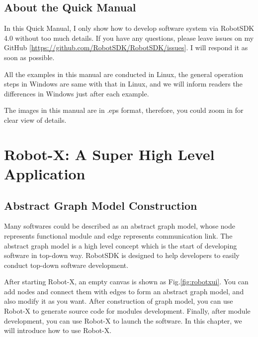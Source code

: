 \documentclass[a4paper,10pt]{book}
\begin{document}
\section{About the Quick Manual}

In this Quick Manual, I only show how to develop software system via RobotSDK 4.0 without too much details. If you have any questions, please leave issues on my GitHub [\url{https://github.com/RobotSDK/RobotSDK/issues}]. I will respond it as soon as possible. 

All the examples in this manual are conducted in Linux, the general operation steps in Windows are same with that in Linux, and we will inform readers the differences in Windows just after each example.

The images in this manual are in .eps format, therefore, you could zoom in for clear view of details.

\chapter{Robot-X: A Super High Level Application}\label{robotx}

\section{Abstract Graph Model Construction}

Many softwares could be described as an abstract graph model, whose node represents functional module and edge represents communication link. The abstract graph model is a high level concept which is the start of developing software in top-down way. RobotSDK is designed to help developers to easily conduct top-down software development.

After starting Robot-X, an empty canvas is shown as Fig.\ref{fig:robotxui}. You can add nodes and connect them with edges to form an abstract graph model, and also modify it as you want. After construction of graph model, you can use Robot-X to generate source code for modules development. Finally, after module development, you can use Robot-X to launch the software. In this chapter, we will introduce how to use Robot-X.
\end{document}

